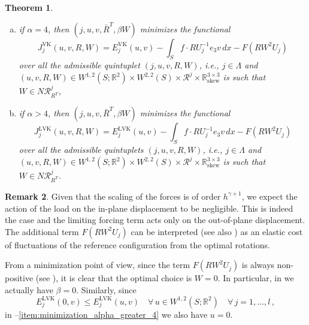 \documentclass{article}
\theoremstyle{plain}
\newtheorem{teo}{Theorem}[section]
\theoremstyle{plain}
\theoremstyle{plain}
\theoremstyle{plain}
\theoremstyle{plain}
\theoremstyle{definition}
\newtheorem{remark}[teo]{Remark}
\theoremstyle{definition}
\renewcommand{\r}{\mathbb{R}}
\DeclareMathOperator{\skw}{skew}
\DeclareMathOperator{\VK}{VK}
\DeclareMathOperator{\LVK}{LVK}
\begin{document}
\begin{teo}
\begin{enumerate}[(a)]
		\item if $\alpha = 4$, then $(j, u, v, \bar R^T, \beta W)$ minimizes the functional
		\[
			J^{\VK}_j(u, v, R, W) = E^{\VK}_j(u, v) - \int_S f \cdot R U_j^{-1} e_3 v \, dx - F(R W^2U_j)
		\]
		over all the admissible quintuplet $(j, u, v, R, W)$, i.e., $j \in \Lambda$ and $(u, v, R, W) \in W^{1,2}(S; \r^2) \times W^{2, 2}(S) \times \mathcal{R}^j \times \r^{3 \times 3}_{\skw}$ is such that $W \in N\mathcal{R}^j_{R^T}$,
		\item if $\alpha > 4$, then $(j, u, v, \bar R^T, \beta W)$ minimizes the functional
		\[
			J^{\LVK}_j(u, v, R, W) = E^{\LVK}_j(u, v) - \int_S f \cdot R U_j^{-1} e_3 v \, dx - F(R W^2 U_j)
		\]
		over all the admissible quintuplets $(j, u, v, R, W)$, i.e., $j \in \Lambda$ and $(u, v, R, W) \in W^{1,2}(S; \r^2) \times W^{2, 2}(S) \times \mathcal{R}^j \times \r^{3 \times 3}_{\skw}$ is such that $W \in N\mathcal{R}^j_{R^T}$.\label{item:minimization_alpha_greater_4}
	\end{enumerate}

\end{teo}

\begin{remark}
    Given that the scaling of the forces is of order $h^{\gamma + 1}$, we expect the action of the load on the in-plane displacement to be negligible. This is indeed the case and the limiting forcing term acts only on the out-of-plane displacement. The additional term $F(RW^2U_j)$ can be interpreted (see also \cite{MAOR2021}) as an elastic cost of fluctuations of the reference configuration from the optimal rotations.

    From a minimization point of view, since the term $F(RW^2U_j)$ is always non-positive (see ), it is clear that the optimal choice is $W = 0$. In particular, in  we actually have $\beta = 0$. Similarly, since
    \begin{equation}
        E_j^{\LVK}(0, v) \leq E_j^{\LVK}(u, v) \quad \forall \, u \in W^{1, 2}(S; \r^2) \quad \forall \, j = 1, \dots, l\,,
    \end{equation}
    in --\ref{item:minimization_alpha_greater_4} we also have $u = 0$.
\end{remark}
\end{document}
